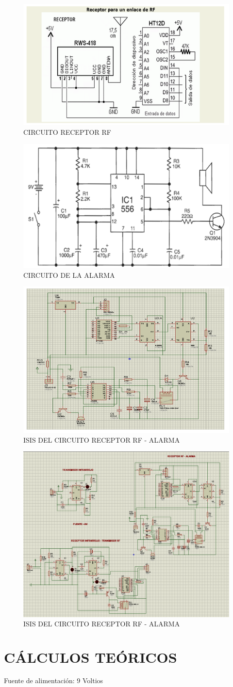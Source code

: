 \documentclass[a4paper,11pt]{article}
\begin{document}
	\begin{figure}[h]
		\caption{CIRCUITO RECEPTOR RF }
		\centering
		\includegraphics[width=0.7\linewidth]{./15}
	\end{figure}

	\begin{figure}[h]
		\caption{CIRCUITO DE LA ALARMA}
		\centering
		\includegraphics[width=0.7\linewidth]{./16}
	\end{figure}

	\begin{figure}[h]
		\caption{ISIS DEL CIRCUITO RECEPTOR RF - ALARMA}
		\centering
		\includegraphics[width=0.7\linewidth]{./17}
	\end{figure}
	
	\begin{figure}[h]
		\caption{ISIS DEL CIRCUITO RECEPTOR RF - ALARMA}
		\centering
		\includegraphics[width=0.6\linewidth]{./18}
	\end{figure}
\newpage
\section{CÁLCULOS TEÓRICOS}
Fuente de alimentación: 9 Voltios
\end{document}
